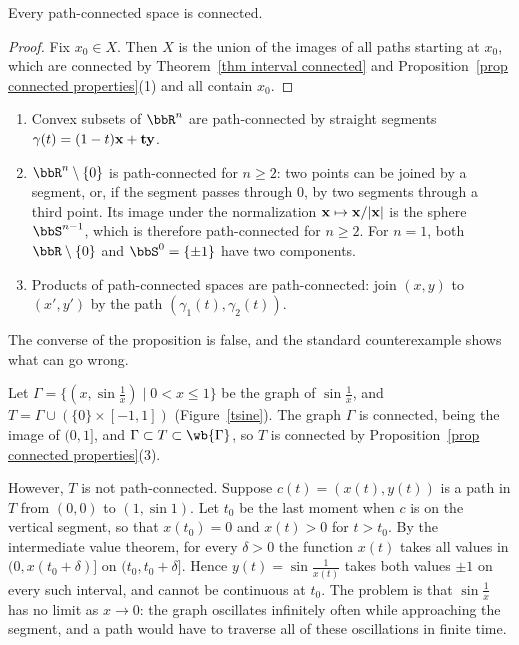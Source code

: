 \begin{prop}
    Every path-connected space is connected.
\end{prop}
\begin{proof}
    Fix $x_0\in X$. Then $X$ is the union of the images of all paths starting at $x_0$, which are connected by Theorem~\ref{thm interval connected} and Proposition~\ref{prop connected properties}(1) and all contain $x_0$.
\end{proof}

\begin{example}\label{example path connected}
    \begin{enumerate}
        \item Convex subsets of $\bbR^n$ are path-connected by straight segments $\gamma(t)=(1-t)\bf{x}+t\bf{y}$.
        \item $\bbR^n\setminus\{0\}$ is path-connected for $n\geq2$: two points can be joined by a segment, or, if the segment passes through $0$, by two segments through a third point. Its image under the normalization $\bf{x}\mapsto \bf{x}/\lvert \bf{x}\rvert$ is the sphere $\bbS^{n-1}$, which is therefore path-connected for $n\geq 2$. For $n=1$, both $\bbR\setminus\{0\}$ and $\bbS^0=\{\pm1\}$ have two components.
        \item Products of path-connected spaces are path-connected: join $(x,y)$ to $(x',y')$ by the path $(\gamma_1(t),\gamma_2(t))$.
    \end{enumerate}
\end{example}

The converse of the proposition is false, and the standard counterexample shows what can go wrong.

\begin{example}\label{example sine curve}
    Let $\Gamma=\{(x,\sin\frac1x)\mid 0<x\leq1\}$ be the graph of $\sin\frac1x$, and $T=\Gamma\cup(\{0\}\times[-1,1])$ (Figure~\ref{tsine}). The graph $\Gamma$ is connected, being the image of $(0,1]$, and $\Gamma\subset T\subset\wb{\Gamma}$, so $T$ is connected by Proposition~\ref{prop connected properties}(3).

    However, $T$ is not path-connected. Suppose $c(t)=(x(t),y(t))$ is a path in $T$ from $(0,0)$ to $(1,\sin1)$. Let $t_0$ be the last moment when $c$ is on the vertical segment, so that $x(t_0)=0$ and $x(t)>0$ for $t>t_0$. By the intermediate value theorem, for every $\delta>0$ the function $x(t)$ takes all values in $(0,x(t_0+\delta)]$ on $(t_0,t_0+\delta]$. Hence $y(t)=\sin\frac{1}{x(t)}$ takes both values $\pm1$ on every such interval, and cannot be continuous at $t_0$. The problem is that $\sin\frac1x$ has no limit as $x\to0$: the graph oscillates infinitely often while approaching the segment, and a path would have to traverse all of these oscillations in finite time.
\end{example}

